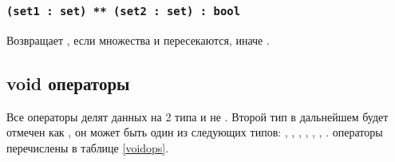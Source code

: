 \subsubsection{\lstinline|(set1 : set) ** (set2 : set) : bool|}

Возвращает \true, если множества  и  пересекаются, иначе \false.

\subsection{\color{lightblue}void операторы}

Все \void{} операторы делят данных на 2 типа \void{} и не \void{}. Второй тип в дальнейшем будет отмечен как , он может быть один из следующих типов: \integer{}, \double{}, \str{}, \listtype{}, \object{}, \set{}, \element{}. \void{} операторы перечислены в таблице \ref{voidops}.

